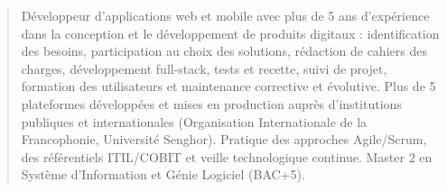 \documentclass[10pt,a4paper,ragged2e,withhyper]{altacv}
\begin{document}

    
    \makecvheader

    \begin{quote}
    \normalsize Développeur d'applications web et mobile avec plus de 5 ans d'expérience dans la conception et le développement de produits digitaux : identification des besoins, participation au choix des solutions, rédaction de cahiers des charges, développement full-stack, tests et recette, suivi de projet, formation des utilisateurs et maintenance corrective et évolutive. Plus de 5 plateformes développées et mises en production auprès d'institutions publiques et internationales (Organisation Internationale de la Francophonie, Université Senghor). Pratique des approches Agile/Scrum, des référentiels ITIL/COBIT et veille technologique continue. Master 2 en Système d'Information et Génie Logiciel (BAC+5).
    \end{quote}
    \vspace{-0.5em}
\end{document}
